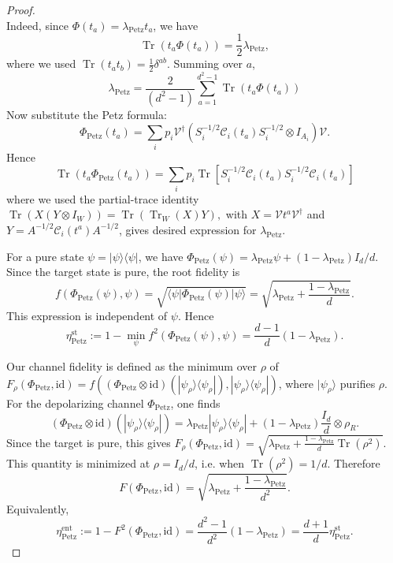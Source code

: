 \documentclass[10pt,twocolumn,superscriptaddress,aps,amsmath,amssymb,citeautoscript,floatfix,prx]{revtex4-2}
\theoremstyle{plain}
\theoremstyle{plain}
\theoremstyle{plain}
\theoremstyle{plain}
\theoremstyle{plain}
\theoremstyle{plain}
\theoremstyle{plain}
\theoremstyle{definition}
\theoremstyle{plain}
\begin{document}
\begin{appendix}
\begin{proof}
\begin{equation}
\end{equation}
Indeed, since $\Phi\left(t_a\right)=\lambda_{\text{Petz}} t_a$, we have
$$
\operatorname{Tr}\left(t_a \Phi\left(t_a\right)\right)=\frac{1}{2} \lambda_{\text{Petz}},
$$
where we used $\operatorname{Tr}\left(t_a t_b\right)=\frac{1}{2} \delta^{a b}$. Summing over $a$,
$$
\lambda_{\text{Petz}}=\frac{2}{\left(d^2-1\right)} \sum_{a=1}^{d^2-1} \operatorname{Tr}\left(t_a \Phi\left(t_a\right)\right)
$$
Now substitute the Petz formula:
$$
\Phi_{\mathrm{Petz}}\left(t_a\right)=\sum_i p_i \mathcal{V}^{\dagger}\left(S_i^{-1 / 2} \mathcal{C}_i\left(t_a\right) S_i^{-1 / 2} \otimes I_{A_i}\right) \mathcal{V}.
$$
Hence
$$
\operatorname{Tr}\left(t_a \Phi_{\text{Petz}}\left(t_a\right)\right)=\sum_i p_i \operatorname{Tr}\left[S_i^{-1 / 2} 
\mathcal{C}_i\left(t_a\right) S_i^{-1 / 2} \mathcal{C}_i\left(t_a\right)\right]
$$
where we used the partial-trace identity
$
\operatorname{Tr}\left(X\left(Y \otimes I_W\right)\right)=\operatorname{Tr}\left(\operatorname{Tr}_W(X) Y\right),
$
with $X=\mathcal{V} t^a \mathcal{V}^{\dagger}$ and $Y=A^{-1 / 2} \mathcal{C}_i\left(t^a\right) A^{-1 / 2}$, gives desired expression for $\lambda_{\mathrm{Petz}}$.

For a pure state \(\psi=|\psi\rangle\langle\psi|\), we have \(\Phi_{\mathrm{Petz}}(\psi)=\lambda_{\mathrm{Petz}}\psi+(1-\lambda_{\mathrm{Petz}})I_d/d\). 
Since the target state is pure, the root fidelity is
\[
f(\Phi_{\mathrm{Petz}}(\psi),\psi)
=
\sqrt{\langle\psi|\Phi_{\mathrm{Petz}}(\psi)|\psi\rangle}
=
\sqrt{\lambda_{\mathrm{Petz}}+\frac{1-\lambda_{\mathrm{Petz}}}{d}} .
\]
This expression is independent of \(\psi\). Hence
\[
\eta_{\mathrm{Petz}}^{\mathrm{st}}
:=
1-\min_{\psi}f^2(\Phi_{\mathrm{Petz}}(\psi),\psi)
=
\frac{d-1}{d}(1-\lambda_{\mathrm{Petz}}).
\]

Our channel fidelity is defined as the minimum over \(\rho\) of \(F_\rho(\Phi_{\mathrm{Petz}},\mathrm{id})=f((\Phi_{\mathrm{Petz}}\otimes\mathrm{id})(|\psi_\rho\rangle\langle\psi_\rho|),|\psi_\rho\rangle\langle\psi_\rho|)\), where \(|\psi_\rho\rangle\) purifies \(\rho\). 
For the depolarizing channel \(\Phi_{\mathrm{Petz}}\), one finds
\[
(\Phi_{\mathrm{Petz}}\otimes \mathrm{id})(|\psi_\rho\rangle\langle\psi_\rho|)
=
\lambda_{\mathrm{Petz}}|\psi_\rho\rangle\langle\psi_\rho|
+(1-\lambda_{\mathrm{Petz}})\frac{I_d}{d}\otimes \rho_R .
\]
Since the target is pure, this gives \(F_\rho(\Phi_{\mathrm{Petz}},\mathrm{id})=\sqrt{\lambda_{\mathrm{Petz}}+\frac{1-\lambda_{\mathrm{Petz}}}{d}\operatorname{Tr}(\rho^2)}\). 
This quantity is minimized at \(\rho=I_d/d\), i.e. when \(\operatorname{Tr}(\rho^2)=1/d\). Therefore
\[
F(\Phi_{\mathrm{Petz}},\mathrm{id})
=
\sqrt{\lambda_{\mathrm{Petz}}+\frac{1-\lambda_{\mathrm{Petz}}}{d^2}} .
\]
Equivalently,
\[
\eta_{\mathrm{Petz}}^{\mathrm{ent}}
:=
1-F^2(\Phi_{\mathrm{Petz}},\mathrm{id})
=
\frac{d^2-1}{d^2}(1-\lambda_{\mathrm{Petz}})
=
\frac{d+1}{d}\eta_{\mathrm{Petz}}^{\mathrm{st}} .
\]


\end{proof}
\end{appendix}
\end{document}
